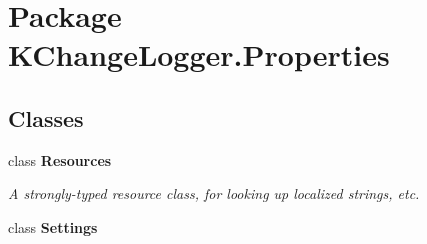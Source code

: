 \hypertarget{namespace_k_change_logger_1_1_properties}{\section{Package K\-Change\-Logger.\-Properties}
\label{namespace_k_change_logger_1_1_properties}
}
\subsection*{Classes}
\begin{DoxyCompactItemize}
\item 
class {\bfseries Resources}
\begin{DoxyCompactList}\small\item\em A strongly-\/typed resource class, for looking up localized strings, etc. \end{DoxyCompactList}\item 
class {\bfseries Settings}
\end{DoxyCompactItemize}
